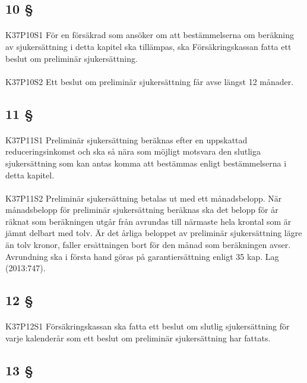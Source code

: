 \documentclass[a4paper,notitlepage,openany,10pt]{book}
\begin{document}
\subsection*{10 §}
\paragraph*{}
{\tiny K37P10S1}
För en försäkrad som ansöker om att bestämmelserna om beräkning av sjukersättning i detta kapitel ska tillämpas, ska Försäkringskassan fatta ett beslut om preliminär sjukersättning.
\paragraph*{}
{\tiny K37P10S2}
Ett beslut om preliminär sjukersättning får avse längst 12 månader.
\subsection*{11 §}
\paragraph*{}
{\tiny K37P11S1}
Preliminär sjukersättning beräknas efter en uppskattad reduceringsinkomst och ska så nära som möjligt motsvara den slutliga sjukersättning som kan antas komma att bestämmas enligt bestämmelserna i detta kapitel.
\paragraph*{}
{\tiny K37P11S2}
Preliminär sjukersättning betalas ut med ett månadsbelopp.
När månadsbelopp för preliminär sjukersättning beräknas ska det belopp för år räknat som beräkningen utgår från avrundas till närmaste hela krontal som är jämnt delbart med tolv. Är det årliga beloppet av preliminär sjukersättning lägre än tolv kronor, faller ersättningen bort för den månad som beräkningen avser. Avrundning ska i första hand göras på garantiersättning enligt 35 kap.
Lag (2013:747).
\subsection*{12 §}
\paragraph*{}
{\tiny K37P12S1}
Försäkringskassan ska fatta ett beslut om slutlig sjukersättning för varje kalenderår som ett beslut om preliminär sjukersättning har fattats.
\subsection*{13 §}
\end{document}
